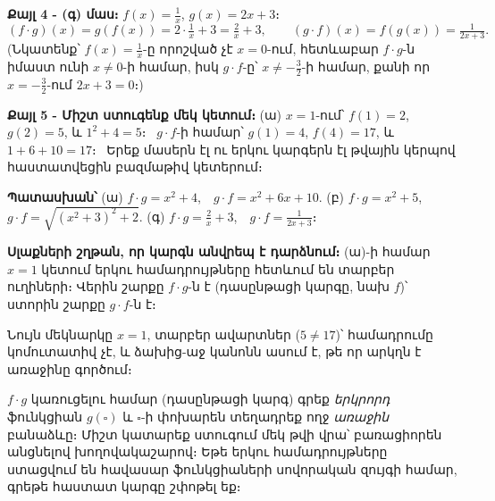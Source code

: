 \documentclass[11pt,a4paper]{article}
\newcommand{\answer}[1]{\begin{answerbox}\centering\textbf{Պատասխան՝}\quad #1\end{answerbox}}
\begin{document}
\textbf{Քայլ 4 - (գ) մաս։} $f(x)=\tfrac1x$, $g(x)=2x+3$։
\[
(f\cdot g)(x)=g(f(x))=2\cdot\tfrac1x+3=\tfrac2x+3,\qquad
(g\cdot f)(x)=f(g(x))=\tfrac{1}{2x+3}.
\]
(Նկատենք՝ $f(x)=\tfrac1x$-ը որոշված չէ $x=0$-ում, հետևաբար $f\cdot g$-ն իմաստ ունի $x\ne0$-ի համար, իսկ
$g\cdot f$-ը՝ $x\ne-\tfrac32$-ի համար, քանի որ $x=-\tfrac32$-ում $2x+3=0$։)

\textbf{Քայլ 5 - Միշտ ստուգենք մեկ կետում։} (ա) $x=1$-ում՝ $f(1)=2$, $g(2)=5$, և
$1^2+4=5$։ \checkmark\ $g\cdot f$-ի համար՝ $g(1)=4$, $f(4)=17$, և $1+6+10=17$։ \checkmark\ Երեք
մասերն էլ ու երկու կարգերն էլ թվային կերպով հաստատվեցին բազմաթիվ կետերում։

\answer{%
(ա) $f\cdot g=x^2+4$,\ \ $g\cdot f=x^2+6x+10$.\quad
(բ) $f\cdot g=x^2+5$,\ \ $g\cdot f=\sqrt{(x^2+3)^2+2}$.\quad
(գ) $f\cdot g=\tfrac2x+3$,\ \ $g\cdot f=\tfrac1{2x+3}$։}

\medskip
\textbf{Սլաքների շղթան, որ կարգն անվրեպ է դարձնում։} (ա)-ի համար $x=1$ կետում երկու
համադրույթները հետևում են տարբեր ուղիների։ Վերին շարքը $f\cdot g$-ն է (դասընթացի կարգը, նախ $f$)՝ ստորին
շարքը $g\cdot f$-ն է։

\begin{center}
\end{center}
Նույն մեկնարկը $x=1$, տարբեր ավարտներ ($5\neq17$)՝ համադրումը կոմուտատիվ չէ, և
ձախից-աջ կանոնն ասում է, թե որ արկղն է առաջինը գործում։

\begin{methodbox}
$f\cdot g$ կառուցելու համար (դասընթացի կարգ) գրեք \emph{երկրորդ}
ֆունկցիան $g(\square)$ և $\square$-ի փոխարեն տեղադրեք ողջ \emph{առաջին} բանաձևը։ Միշտ կատարեք
ստուգում մեկ թվի վրա՝ բառացիորեն անցնելով խողովակաշարով։ Եթե երկու համադրույթները ստացվում են
հավասար ֆունկցիաների սովորական զույգի համար, գրեթե հաստատ կարգը շփոթել եք։
\end{methodbox}
\end{document}
